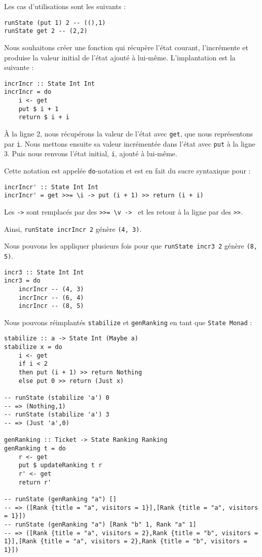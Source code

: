 \documentclass{llncs}
\begin{document}
Les cas d'utilisations sont les suivants :
\begin{lstlisting}
runState (put 1) 2 -- ((),1)
runState get 2 -- (2,2)
\end{lstlisting}

Nous souhaitons créer une fonction qui récupère l'état courant,
l'incrémente et produise la valeur initial de l'état ajouté à lui-même.
L'implantation est la suivante :
\begin{lstlisting}
incrIncr :: State Int Int
incrIncr = do
    i <- get
    put $ i + 1
    return $ i + i
\end{lstlisting}
À la ligne 2, nous récupérons la valeur de l'état avec \lstinline{get}, que nous
représentons par \lstinline{i}.
Nous mettons ensuite sa valeur incrémentée dans l'état avec \lstinline{put} à la
ligne 3.
Puis nous renvons l'état initial, \lstinline{i}, ajouté à lui-même.

Cette notation est appelée \lstinline{do}-notation et est en fait du sucre syntaxique
pour :
\begin{lstlisting}
incrIncr' :: State Int Int
incrIncr' = get >>= \i -> put (i + 1) >> return (i + i)
\end{lstlisting}
Les \lstinline{->} sont remplacés par des \lstinline{>>= \v -> } et les retour à
la ligne par des \lstinline{>>}.

Ainsi, \lstinline{runState incrIncr 2} génère \lstinline{(4, 3)}.

Nous pouvons les appliquer plusieurs fois pour que \lstinline{runState incr3 2} génère \lstinline{(8, 5)}.
\begin{lstlisting}
incr3 :: State Int Int
incr3 = do
    incrIncr -- (4, 3)
    incrIncr -- (6, 4)
    incrIncr -- (8, 5)
\end{lstlisting}

Nous pouvons réimplantés \lstinline{stabilize} et \lstinline{genRanking} en tant
que \lstinline{State Monad} :
\begin{lstlisting}
stabilize :: a -> State Int (Maybe a)
stabilize x = do
    i <- get
    if i < 2
    then put (i + 1) >> return Nothing
    else put 0 >> return (Just x)

-- runState (stabilize 'a') 0
-- => (Nothing,1)
-- runState (stabilize 'a') 3
-- => (Just 'a',0)

genRanking :: Ticket -> State Ranking Ranking
genRanking t = do
    r <- get
    put $ updateRanking t r
    r' <- get
    return r'

-- runState (genRanking "a") []
-- => ([Rank {title = "a", visitors = 1}],[Rank {title = "a", visitors = 1}])
-- runState (genRanking "a") [Rank "b" 1, Rank "a" 1] 
-- => ([Rank {title = "a", visitors = 2},Rank {title = "b", visitors = 1}],[Rank {title = "a", visitors = 2},Rank {title = "b", visitors = 1}])
\end{lstlisting}
\end{document}
